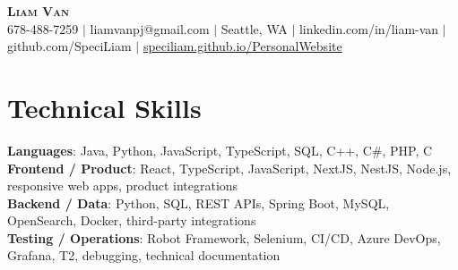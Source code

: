 \documentclass[letterpaper,11pt]{article}
\begin{document}

%
\begin{center}
    \textbf{\Huge \scshape Liam Van} \\ \vspace{1pt}
    \small 678-488-7259 $|$ \small {liamvanpj@gmail.com} $|$ Seattle, WA
 {{$|$ linkedin.com/in/liam-van} {$|$ github.com/SpeciLiam} {$|$ \href{https://speciliam.github.io/PersonalWebsite}{speciliam.github.io/PersonalWebsite}}}

\end{center}

\section{Technical Skills}
 \begin{itemize}[leftmargin=0.15in, label={}]
    \small{\item{
     \textbf{Languages}{: Java, Python, JavaScript, TypeScript, SQL, C++, C\#, PHP, C} \\
     \textbf{Frontend / Product}{: React, TypeScript, JavaScript, NextJS, NestJS, Node.js, responsive web apps, product integrations} \\
     \textbf{Backend / Data}{: Python, SQL, REST APIs, Spring Boot, MySQL, OpenSearch, Docker, third-party integrations} \\
     \textbf{Testing / Operations}{: Robot Framework, Selenium, CI/CD, Azure DevOps, Grafana, T2, debugging, technical documentation} \\
    }}
 \end{itemize}
%
\end{document}
